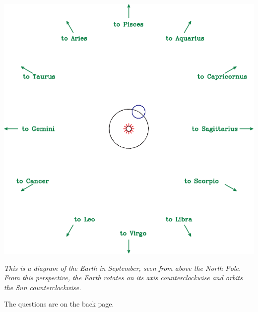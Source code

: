 \documentclass[12pt]{article}
\begin{document}
\begin{center}
\includegraphics[width=6in]{earth-orbit-quiz-crop.pdf}

\it This is a diagram of the Earth in September, seen from above the North Pole. From this perspective, the Earth rotates on its axis counterclockwise and orbits the Sun counterclockwise.

\bigskip

The questions are on the back page.

\end{center}
\newpage
\end{document}
